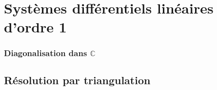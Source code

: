 \section{Systèmes différentiels linéaires d'ordre 1}

\subsubsection{Diagonalisation dans $\mathbb{C}$}
\subsection{Résolution par triangulation}
